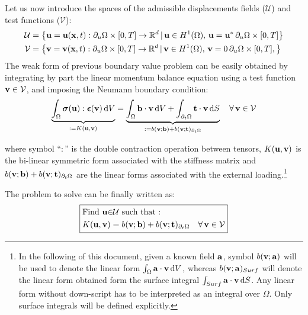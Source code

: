 Let us now introduce the spaces of the admissible displacements fields ($\mathcal{U}$) and test functions ($\mathcal{V}$):
%
\begin{equation}
\begin{aligned}\mathcal{U} & =\left\{ {\bf{u}}={\bf{u}}({\bf{x}},t):\partial_{u}\Omega\times[0,T]\to\mathbb{R}^{d}\,|\,{\bf{u}}\in H^{1}(\Omega),\,{\bf{u}}={\bf{u}}^{*}\,\partial_{u}\Omega\times[0,T]\right\} \\
\mathcal{V} & =\left\{ {\bf{v}}={\bf{v}}({\bf{x}},t):\partial_{u}\Omega\times[0,T]\to\mathbb{R}^{d}\,|\,{\bf{v}}\in H^{1}(\Omega),\,{\bf{v}}=0\,\partial_{u}\Omega\times[0,T],\right\} 
\end{aligned}
\end{equation}
%
The weak form of previous boundary value problem can be easily obtained
by integrating by part the linear momentum balance equation using
a test function ${\bf{v}}\in\mathcal{V}$, and imposing the Neumann boundary
condition:
%
\begin{equation}
%
\underbrace{\int_{\Omega}\bsigma(\bu):\bepsilon(\bv)\,{\rm d}V}_{:=K(\bu,\bv)}=\underbrace{\int_{\Omega}\bb\cdot\bv\,{\rm d}V+\int_{\partial_{t}\Omega}\bt\cdot\bv\,{\rm d}S}_{:=b(\bv;\bb)+b(\bv;\bt)_{\partial_{t}\Omega}}\quad\forall\,\bv\in\mathcal{V}
%
\end{equation}

where symbol ``$:$'' is the double contraction operation between
tensors, $K({\bf{u}},{\bf{v}})$
is the bi-linear symmetric form associated with the stiffness matrix
and $b({\bf{v}};{\bf{b}})+b({\bf{v}};{\bf t})_{\partial_{t}\Omega}$ are the linear forms
associated with the external loading.\footnote{In the following of this document, given a known field ${\bf{a}}$, symbol
$b({\bf{v}};{\bf{a}})$ will be used to denote the linear form $\int_{\Omega}{\bf{a}}\cdot{\bf{v}}\,{\rm d}V$,
whereas $b({\bf{v}};{\bf{a}})_{Surf}$ will denote the linear form obtained
form the surface integral $\int_{Surf}{\bf{a}}\cdot{\bf{v}}\,{\rm d}S$. Any
linear form without down-script has to be interpreted as an integral
over $\Omega$. Only surface integrals will be defined
explicitly.}

The problem to solve can be finally written as:
\begin{equation}
\boxed{\begin{aligned} & \text{Find \ensuremath{{\bf{u}}}\ensuremath{\in}\ensuremath{\mathcal{U}} such that : }\\
 & K({\bf{u}},{\bf{v}})=b({\bf{v}};{\bf{b}})+b({\bf{v}};{\bf t})_{\partial_{t}\Omega}\quad\forall\,{\bf{v}}\in\mathcal{V}
\end{aligned}
}
\end{equation}

